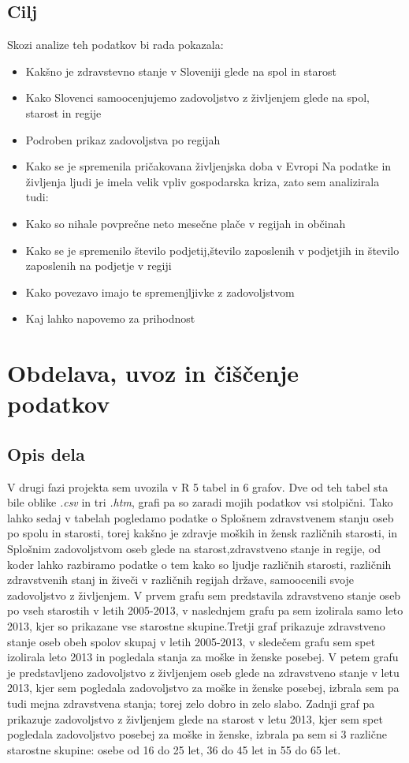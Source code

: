 \documentclass[11pt,a4paper]{article}
\begin{document}
\subsection{Cilj}
Skozi analize teh podatkov bi rada pokazala:
\begin{itemize}
\item Kakšno je zdravstevno stanje v Sloveniji glede na spol in starost
\item Kako Slovenci samoocenjujemo zadovoljstvo z življenjem glede na spol, starost in regije
\item Podroben prikaz zadovoljstva po regijah
\item Kako se je spremenila pričakovana življenjska doba v Evropi
Na podatke in življenja ljudi je imela velik vpliv gospodarska kriza, zato sem analizirala tudi:
\item Kako so nihale povprečne neto mesečne plače v regijah in občinah
\item Kako se je spremenilo število podjetij,število  zaposlenih v podjetjih in število zaposlenih na podjetje v regiji
\item Kako povezavo imajo te spremenjljivke z zadovoljstvom
\item Kaj lahko napovemo za prihodnost
\end{itemize}
\section{Obdelava, uvoz in čiščenje podatkov}
\subsection{Opis dela}
V drugi fazi projekta sem uvozila v R 5 tabel in 6 grafov. Dve od teh tabel sta bile oblike \textit{.csv} in tri \textit{.htm}, grafi pa so zaradi mojih podatkov vsi stolpični. Tako lahko sedaj v tabelah pogledamo podatke o Splošnem zdravstvenem stanju oseb po spolu in starosti, torej kakšno je zdravje moških in žensk različnih starosti, in Splošnim zadovoljstvom oseb glede na starost,zdravstveno stanje in regije, od koder lahko razbiramo podatke o tem kako so ljudje različnih starosti, različnih zdravstvenih stanj in živeči v različnih regijah države, samoocenili svoje zadovoljstvo z življenjem. V prvem grafu sem predstavila zdravstveno stanje oseb po vseh starostih v letih 2005-2013, v naslednjem grafu pa sem izolirala samo leto 2013, kjer so prikazane vse starostne skupine.Tretji graf prikazuje zdravstveno stanje oseb obeh spolov skupaj v letih 2005-2013, v sledečem grafu sem spet izolirala leto 2013 in pogledala stanja za moške in ženske posebej. V petem grafu je predstavljeno zadovoljstvo z življenjem oseb glede na zdravstveno stanje v letu 2013, kjer sem pogledala zadovoljstvo za moške in ženske posebej, izbrala sem pa tudi mejna zdravstvena stanja; torej zelo dobro in zelo slabo. Zadnji graf pa prikazuje zadovoljstvo z življenjem glede na starost v letu 2013, kjer sem spet pogledala zadovoljstvo posebej za moške in ženske, izbrala pa sem si 3 različne starostne skupine: osebe od 16 do 25 let, 36 do 45 let in 55 do 65 let.
\end{document}
